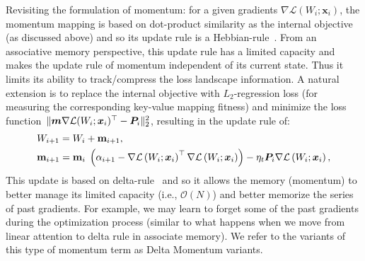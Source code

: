 Revisiting the formulation of momentum: for a given gradients $\nabla \mathcal{L}\left(W_{i};\boldsymbol{x}_i\right)$, the momentum mapping is based on dot-product similarity as the internal objective (as discussed above) and so its update rule is a Hebbian-rule~\citep{hebb2005organization}. From an associative memory perspective, this update rule has a limited capacity
\citep{storkey1997increasing} and makes the update rule of momentum independent of its current state. Thus it limits its ability to track/compress the  loss landscape information.
A natural extension is to replace the internal objective with $L_2$-regression loss (for measuring the corresponding key-value mapping fitness) and minimize the loss function~$\|\boldsymbol{m}  \nabla \mathcal{L}(W_i;\boldsymbol{x}_i)^{\top} - \boldsymbol{P}_i\|^2_2$, resulting in the update rule of:
\begin{align}
    &W_{i+1} = W_i + \mathbf{m}_{i+1},\\ \label{eq:momentum-delta}
    &\mathbf{m}_{i+1} =\mathbf{m}_{i} \;  \left(\alpha_{i+1} -  \nabla \mathcal{L}\left(W_{i};\boldsymbol{x}_i\right)^{\top} \nabla \mathcal{L}\left(W_{i};\boldsymbol{x}_i\right) \right)  - \eta_t \boldsymbol{P}_i  \nabla \mathcal{L}\left(W_{i};\boldsymbol{x}_i\right), 
\end{align}
This update is based on delta-rule~\citep{prados1989neural} and so it allows the memory (momentum) to better manage its limited capacity (i.e., $\mathcal{O}(N)$) and better memorize the series of past gradients. 
For example, we may learn to forget some of the past gradients during the optimization process (similar to what happens when we move from linear attention to delta rule in associate memory).
We refer to the variants of this type of momentum term as Delta Momentum variants. 
 



